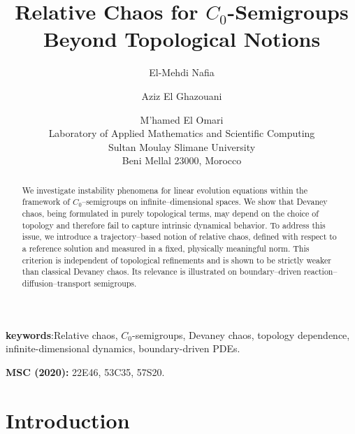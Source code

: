 \documentclass[12pt]{article}
\begin{document}
\title{Relative Chaos for $C_0$-Semigroups Beyond Topological Notions}

\author{
El-Mehdi Nafia\\
\and
Aziz El Ghazouani
\and
M'hamed El Omari\\
Laboratory of Applied Mathematics and Scientific Computing\\
Sultan Moulay Slimane University\\
Beni Mellal 23000, Morocco
}

\date{}
\maketitle

\begin{abstract}
We investigate instability phenomena for linear evolution equations within the framework of $C_0$--semigroups on infinite--dimensional spaces. We show that Devaney chaos, being formulated in purely topological terms, may depend on the choice of topology and therefore fail to capture intrinsic dynamical behavior. To address this issue, we introduce a trajectory--based notion of relative chaos, defined with respect to a reference solution and measured in a fixed, physically meaningful norm. This criterion is independent of topological refinements and is shown to be strictly weaker than classical Devaney chaos. Its relevance is illustrated on boundary--driven reaction--diffusion--transport semigroups.

\end{abstract}

\vspace{0.3cm}
\textbf{keywords}:{Relative chaos, $C_0$-semigroups, Devaney chaos, topology dependence, infinite-dimensional dynamics, boundary-driven PDEs.}



\noindent \textbf{MSC (2020):} 22E46, 53C35, 57S20.

\section{Introduction}
\end{document}
